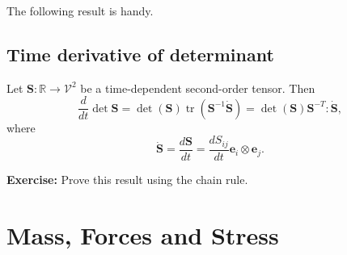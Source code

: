 \documentclass[
  letterpaper,
  DIV=11,
  numbers=noendperiod]{scrreprt}
\theoremstyle{plain}
\theoremstyle{remark}
\begin{document}
The following result is handy.

\section{Time derivative of
determinant}\label{time-derivative-of-determinant}

Let \({\boldsymbol{S}}:{\mathbb{R}}\to{\mathcal{V}}^2\) be a
time-dependent second-order tensor. Then
\[\frac{d}{dt}\det{\boldsymbol{S}}= \det({\boldsymbol{S}}){\operatorname{tr}}({\boldsymbol{S}}^{-1}\dot{{\boldsymbol{S}}}) = \det({\boldsymbol{S}}){\boldsymbol{S}}^{-T}:\dot{{\boldsymbol{S}}},\]
where
\[\dot{{\boldsymbol{S}}} = \frac{d{\boldsymbol{S}}}{dt} = \frac{dS_{ij}}{dt}{\boldsymbol{e}}_i\otimes{\boldsymbol{e}}_j.\]

\textbf{Exercise:} Prove this result using the chain rule.


\chapter{Mass, Forces and Stress}\label{sec-mass-forces}

\newcommand{\bfa}{{\boldsymbol{a}}}
\newcommand{\bfb}{{\boldsymbol{b}}}
\newcommand{\bfc}{{\boldsymbol{c}}}
\newcommand{\bfd}{{\boldsymbol{d}}}
\newcommand{\bfe}{{\boldsymbol{e}}}
\newcommand{\bff}{{\boldsymbol{f}}}
\newcommand{\bfg}{{\boldsymbol{g}}}
\newcommand{\bfh}{{\boldsymbol{h}}}
\newcommand{\bfi}{{\boldsymbol{i}}}
\newcommand{\bfj}{{\boldsymbol{j}}}
\newcommand{\bfk}{{\boldsymbol{k}}}
\newcommand{\bfl}{{\boldsymbol{l}}}
\newcommand{\bfm}{{\boldsymbol{m}}}
\newcommand{\bfn}{{\boldsymbol{n}}}
\newcommand{\bfo}{{\boldsymbol{o}}}
\newcommand{\bfp}{{\boldsymbol{p}}}
\newcommand{\bfq}{{\boldsymbol{q}}}
\newcommand{\bfr}{{\boldsymbol{r}}}
\newcommand{\bfs}{{\boldsymbol{s}}}
\newcommand{\bft}{{\boldsymbol{t}}}
\newcommand{\bfu}{{\boldsymbol{u}}}
\newcommand{\bfv}{{\boldsymbol{v}}}
\newcommand{\bfw}{{\boldsymbol{w}}}
\newcommand{\bfx}{{\boldsymbol{x}}}
\newcommand{\bfy}{{\boldsymbol{y}}}
\newcommand{\bfz}{{\boldsymbol{z}}}

\newcommand{\bfA}{{\boldsymbol{A}}}
\newcommand{\bfB}{{\boldsymbol{B}}}
\newcommand{\bfC}{{\boldsymbol{C}}}
\newcommand{\bfD}{{\boldsymbol{D}}}
\newcommand{\bfE}{{\boldsymbol{E}}}
\newcommand{\bfF}{{\boldsymbol{F}}}
\newcommand{\bfG}{{\boldsymbol{G}}}
\newcommand{\bfH}{{\boldsymbol{H}}}
\newcommand{\bfI}{{\boldsymbol{I}}}
\newcommand{\bfJ}{{\boldsymbol{J}}}
\newcommand{\bfK}{{\boldsymbol{K}}}
\newcommand{\bfL}{{\boldsymbol{L}}}
\newcommand{\bfM}{{\boldsymbol{M}}}
\newcommand{\bfN}{{\boldsymbol{N}}}
\newcommand{\bfO}{{\boldsymbol{O}}}
\newcommand{\bfP}{{\boldsymbol{P}}}
\newcommand{\bfQ}{{\boldsymbol{Q}}}
\newcommand{\bfR}{{\boldsymbol{R}}}
\newcommand{\bfS}{{\boldsymbol{S}}}
\newcommand{\bfT}{{\boldsymbol{T}}}
\newcommand{\bfU}{{\boldsymbol{U}}}
\newcommand{\bfV}{{\boldsymbol{V}}}
\newcommand{\bfW}{{\boldsymbol{W}}}
\newcommand{\bfX}{{\boldsymbol{X}}}
\newcommand{\bfY}{{\boldsymbol{Y}}}
\newcommand{\bfZ}{{\boldsymbol{Z}}}
\end{document}
